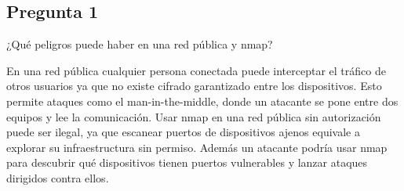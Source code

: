 \subsection{Pregunta 1}
¿Qué peligros puede haber en una red pública y nmap?

\begin{respuesta}
En una red pública cualquier persona conectada puede interceptar el tráfico de otros usuarios ya que no existe cifrado garantizado entre los dispositivos. Esto permite ataques como el man-in-the-middle, donde un atacante se pone entre dos equipos y lee la comunicación. Usar nmap en una red pública sin autorización puede ser ilegal, ya que escanear puertos de dispositivos ajenos equivale a explorar su infraestructura sin permiso. Además un atacante podría usar nmap para descubrir qué dispositivos tienen puertos vulnerables y lanzar ataques dirigidos contra ellos.


    
\end{respuesta}
